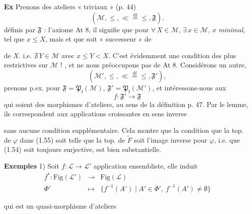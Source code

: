 \documentclass[11pt,a4paper]{article}
\begin{document}
\textbf{Ex} Prenons des ateliers « triviaux » (p. 44)
\[
  (\mathcal{M}, \leq, \ll \overset{\mathrm{df}}{=} \leq, \mathfrak{F}).
\]
\struck{\ill{} \ill{}} définis par \struck{\ill{}} $\mathfrak{F}$ : l'axiome At 8, il signifie que pour  $\forall\, X \in \mathcal{M}$, $\exists\, x \in \mathcal{M}$, $x$ \emph{minimal}, tel que $x \leq X$, mais et que  soit « successeur » de 

de $X$. i.e. $\nexists\, Y \in \mathcal{M}$ avec $x \leq Y < X$. C'est évidemment une condition des plus restrictives sur $\mathcal{M}$ ! , et ne nous préoccupons pas de At 8. Considérons  un autre,
\[
  (\mathcal{M}', \leq, \ll \overset{\mathrm{df}}{=} \leq, \mathfrak{F}'),
\]
prenons  p.ex. pour $\mathfrak{F} = \mathfrak{P}_{\mathrm{f}}(\mathcal{M})$, $\mathfrak{F}' = \mathfrak{P}_{\mathrm{f}}(\mathcal{M}')$, et intéressons-nous aux
\[
  f : \mathfrak{F}' \longrightarrow \mathfrak{F}
\]
 qui soient des morphismes d'ateliers, au sens de la définition p. 47. Par le lemme, ils correspondent aux \struck{\ill{}} applications croissantes en sens inverse


sans aucune condition supplémentaire. Cela montre que la condition que \ill{} \ill{} la top. de $\varphi$ dans (1.55) soit telle que la top. de $\widetilde{F}$ soit l'image inverse pour $\varphi$, i.e. que (1.54) soit toujours surjective, est bien substantielle.


\textbf{Exemples} 1) Soit $f : \mathcal{L} \to \mathcal{L}'$ application ensembliste, elle induit 
\[
  \begin{array}{rcl}
    f^{*} : \mathrm{Fig}(\mathcal{L}') & \longrightarrow & \mathrm{Fig}(\mathcal{L}) \\
    \Phi' & \longmapsto & \lbrace f^{-1}(A') \mid A' \in \Phi',\ f^{-1}(A') \neq \emptyset \rbrace
  \end{array}
\]

qui est un quasi-morphisme d'ateliers
\end{document}
